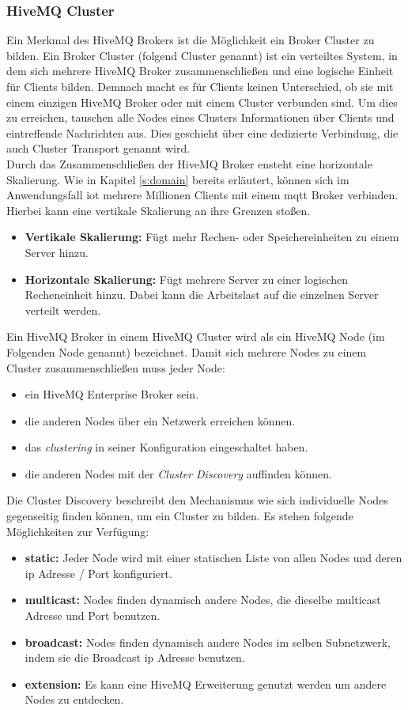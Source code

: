 \subsubsection{HiveMQ Cluster} \label{s:hivemq-cluster}
Ein Merkmal des HiveMQ Brokers ist die Möglichkeit ein Broker Cluster zu bilden.
Ein Broker Cluster (folgend Cluster genannt) ist ein verteiltes System, in dem sich mehrere HiveMQ Broker zusammenschlie{\ss}en und eine logische Einheit für Clients bilden.
Demnach macht es für Clients keinen Unterschied, ob sie mit einem einzigen HiveMQ Broker oder mit einem Cluster verbunden sind.
Um dies zu erreichen, tauschen alle Nodes eines Clusters Informationen über Clients und eintreffende Nachrichten aus. Dies geschieht über eine dedizierte Verbindung, die auch Cluster Transport genannt wird.
\cite{HiveMQClusterHiveMQ}
\\
Durch das Zusammenschlie{\ss}en der HiveMQ Broker ensteht eine horizontale Skalierung. Wie in Kapitel \ref{s:domain} bereits erläutert, können sich im Anwendungsfall \ac{iot} mehrere Millionen Clients mit einem \ac{mqtt} Broker verbinden. Hierbei kann eine vertikale Skalierung an ihre Grenzen sto{\ss}en.
\cite{HowScaleIT}
\begin{itemize}
    \item \textbf{Vertikale Skalierung:} Fügt mehr Rechen- oder Speichereinheiten zu einem Server hinzu.
    \item \textbf{Horizontale Skalierung:} Fügt mehrere Server zu einer logischen Recheneinheit hinzu. Dabei kann die Arbeitslast auf die einzelnen Server verteilt werden.
\end{itemize}
Ein HiveMQ Broker in einem HiveMQ Cluster wird als ein HiveMQ Node (im Folgenden Node genannt) bezeichnet.
Damit sich mehrere Nodes zu einem Cluster zusammenschlie{\ss}en muss jeder Node:
\begin{itemize}
    \item ein HiveMQ Enterprise Broker sein.
    \item die anderen Nodes über ein Netzwerk erreichen können.
    \item das \textit{clustering} in seiner Konfiguration eingeschaltet haben.
    \item die anderen Nodes mit der \textit{Cluster Discovery} auffinden können.
\end{itemize}
Die Cluster Discovery beschreibt den Mechanismus wie sich individuelle Nodes gegenseitig finden können, um ein Cluster zu bilden. Es stehen folgende Möglichkeiten zur Verfügung:
\begin{itemize}
    \item \textbf{static:} Jeder Node wird mit einer statischen Liste von allen Nodes und deren \ac{ip} Adresse / Port konfiguriert.
    \item \textbf{multicast:} Nodes finden dynamisch andere Nodes, die dieselbe multicast Adresse und Port benutzen.
    \item \textbf{broadcast:} Nodes finden dynamisch andere Nodes im selben Subnetzwerk, indem sie die Broadcast \ac{ip} Adresse benutzen.
    \item \textbf{extension:} Es kann eine HiveMQ Erweiterung genutzt werden um andere Nodes zu entdecken.
\end{itemize}
